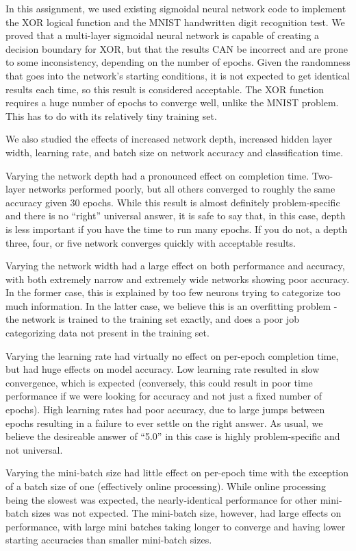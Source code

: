 \documentclass[letter,11pt,titlepage]{article}
\begin{document}
In this assignment, we used existing sigmoidal neural network code to implement the XOR logical function and the MNIST handwritten digit recognition test. We proved that a multi-layer sigmoidal neural network is capable of creating a decision boundary for XOR, but that the results CAN be incorrect and are prone to some inconsistency, depending on the number of epochs. Given the randomness that goes into the network's starting conditions, it is not expected to get identical results each time, so this result is considered acceptable. The XOR function requires a huge number of epochs to converge well, unlike the MNIST problem. This has to do with its relatively tiny training set.

We also studied the effects of increased network depth, increased hidden layer width, learning rate, and batch size on network accuracy and classification time.

Varying the network depth had a pronounced effect on completion time. Two-layer networks performed poorly, but all others converged to roughly the same accuracy given 30 epochs. While this result is almost definitely problem-specific and there is no ``right'' universal answer, it is safe to say that, in this case, depth is less important if you have the time to run many epochs. If you do not, a depth three, four, or five network converges quickly with acceptable results.

Varying the network width had a large effect on both performance and accuracy, with both extremely narrow and extremely wide networks showing poor accuracy. In the former case, this is explained by too few neurons trying to categorize too much information. In the latter case, we believe this is an overfitting problem - the network is trained to the training set exactly, and does a poor job categorizing data not present in the training set.

Varying the learning rate had virtually no effect on per-epoch completion time, but had huge effects on model accuracy. Low learning rate resulted in slow convergence, which is expected (conversely, this could result in poor time performance if we were looking for accuracy and not just a fixed number of epochs). High learning rates had poor accuracy, due to large jumps between epochs resulting in a failure to ever settle on the right answer. As usual, we believe the desireable answer of ``5.0'' in this case is highly problem-specific and not universal.

Varying the mini-batch size had little effect on per-epoch time with the exception of a batch size of one (effectively online processing). While online processing being the slowest was expected, the nearly-identical performance for other mini-batch sizes was not expected. The mini-batch size, however, had large effects on performance, with large mini batches taking longer to converge and having lower starting accuracies than smaller mini-batch sizes.
\end{document}
